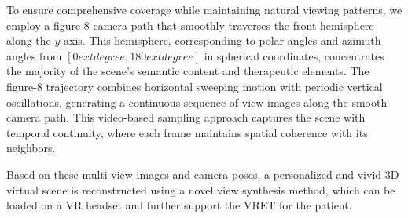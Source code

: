 \documentclass[]{interact}
\begin{document}
To ensure comprehensive coverage while maintaining natural viewing patterns, we employ a figure-8 camera path that smoothly traverses the front hemisphere along the $y$-axis. This hemisphere, corresponding to polar angles and azimuth angles from $[0	extdegree,180	extdegree]$ in spherical coordinates, concentrates the majority of the scene's semantic content and therapeutic elements. The figure-8 trajectory combines horizontal sweeping motion with periodic vertical oscillations, generating a continuous sequence of view images along the smooth camera path. This video-based sampling approach captures the scene with temporal continuity, where each frame maintains spatial coherence with its neighbors. 


Based on these multi-view images and camera poses, a personalized and vivid 3D virtual scene is reconstructed using a novel view synthesis method, which can be loaded on a VR headset and further support the VRET for the patient.
\end{document}

